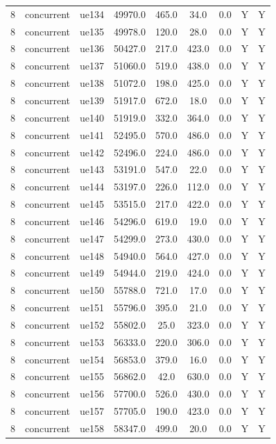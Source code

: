 \begin{table}[ht]
\begin{tabular}{|c|c|c|c|c|c|c|c|c|}
8 & concurrent & ue134 & 49970.0 & 465.0 & 34.0 & 0.0 & Y & Y \\
8 & concurrent & ue135 & 49978.0 & 120.0 & 28.0 & 0.0 & Y & Y \\
8 & concurrent & ue136 & 50427.0 & 217.0 & 423.0 & 0.0 & Y & Y \\
8 & concurrent & ue137 & 51060.0 & 519.0 & 438.0 & 0.0 & Y & Y \\
8 & concurrent & ue138 & 51072.0 & 198.0 & 425.0 & 0.0 & Y & Y \\
8 & concurrent & ue139 & 51917.0 & 672.0 & 18.0 & 0.0 & Y & Y \\
8 & concurrent & ue140 & 51919.0 & 332.0 & 364.0 & 0.0 & Y & Y \\
8 & concurrent & ue141 & 52495.0 & 570.0 & 486.0 & 0.0 & Y & Y \\
8 & concurrent & ue142 & 52496.0 & 224.0 & 486.0 & 0.0 & Y & Y \\
8 & concurrent & ue143 & 53191.0 & 547.0 & 22.0 & 0.0 & Y & Y \\
8 & concurrent & ue144 & 53197.0 & 226.0 & 112.0 & 0.0 & Y & Y \\
8 & concurrent & ue145 & 53515.0 & 217.0 & 422.0 & 0.0 & Y & Y \\
8 & concurrent & ue146 & 54296.0 & 619.0 & 19.0 & 0.0 & Y & Y \\
8 & concurrent & ue147 & 54299.0 & 273.0 & 430.0 & 0.0 & Y & Y \\
8 & concurrent & ue148 & 54940.0 & 564.0 & 427.0 & 0.0 & Y & Y \\
8 & concurrent & ue149 & 54944.0 & 219.0 & 424.0 & 0.0 & Y & Y \\
8 & concurrent & ue150 & 55788.0 & 721.0 & 17.0 & 0.0 & Y & Y \\
8 & concurrent & ue151 & 55796.0 & 395.0 & 21.0 & 0.0 & Y & Y \\
8 & concurrent & ue152 & 55802.0 & 25.0 & 323.0 & 0.0 & Y & Y \\
8 & concurrent & ue153 & 56333.0 & 220.0 & 306.0 & 0.0 & Y & Y \\
8 & concurrent & ue154 & 56853.0 & 379.0 & 16.0 & 0.0 & Y & Y \\
8 & concurrent & ue155 & 56862.0 & 42.0 & 630.0 & 0.0 & Y & Y \\
8 & concurrent & ue156 & 57700.0 & 526.0 & 430.0 & 0.0 & Y & Y \\
8 & concurrent & ue157 & 57705.0 & 190.0 & 423.0 & 0.0 & Y & Y \\
8 & concurrent & ue158 & 58347.0 & 499.0 & 20.0 & 0.0 & Y & Y \\

\end{tabular}
\end{table}
